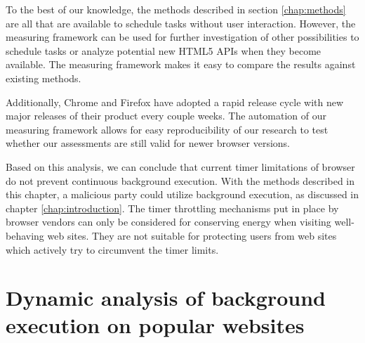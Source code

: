 \documentclass[
	ruledheaders=section,%
	class=report,%
	thesis={type=bachelor},%
	accentcolor=9c,%
	custommargins=true,%
	marginpar=false,%
	parskip=half-,%
	fontsize=11pt,%
]{tudapub}
\begin{document}
  To the best of our knowledge, the methods described in section \ref{chap:methods} are all that are available to schedule tasks without user interaction. However, the measuring framework can be used for further investigation of other possibilities to schedule tasks or analyze potential new HTML5 APIs when they become available. The measuring framework makes it easy to compare the results against existing methods.

  Additionally, Chrome and Firefox have adopted a rapid release cycle with new major releases of their product every couple weeks. The automation of our measuring framework allows for easy reproducibility of our research to test whether our assessments are still valid for newer browser versions.

  Based on this analysis, we can conclude that current timer limitations of browser do not prevent continuous background execution. With the methods described in this chapter, a malicious party could utilize background execution, as discussed in chapter \ref{chap:introduction}. The timer throttling mechanisms put in place by browser vendors can only be considered for conserving energy when visiting well-behaving web sites. They are not suitable for protecting users from web sites which actively try to circumvent the timer limits.

  \newpage
  \chapter{Dynamic analysis of background execution on popular websites}
  \label{chap:tracing}
\end{document}
